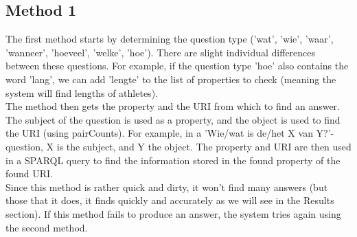 \documentclass[a4paper,11pt]{article}
\begin{document}
\subsection{Method 1}
The first method starts by determining the question type ('wat', 'wie', 'waar', 'wanneer', 'hoeveel', 'welke', 'hoe'). There are slight individual differences between these questions. For example, if the question type 'hoe' also contains the word 'lang', we can add 'lengte' to the list of properties to check (meaning the system will find lengths of athletes).\vspace{2mm}\\
The method then gets the property and the URI from which to find an answer. The subject of the question is used as a property, and the object is used to find the URI (using pairCounts). For example, in a 'Wie/wat is de/het X van Y?'-question, X is the subject, and Y the object. The property and URI are then used in a SPARQL query to find the information stored in the found property of the found URI.\vspace{2mm}\\
Since this method is rather quick and dirty, it won't find many answers (but those that it does, it finds quickly and accurately as we will see in the Results section). If this method fails to produce an answer, the system tries again using the second method.
\end{document}
